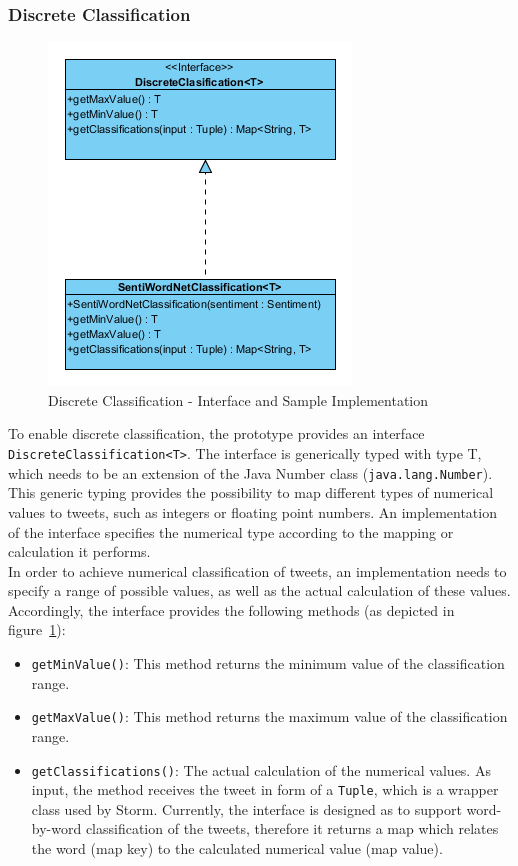 \documentclass[a4paper]{article}
\begin{document}
\subsubsection{Discrete Classification}\label{section_discrete}
\begin{figure}[h!]
	\centering
	\includegraphics[scale=2.5]{images/uml_discrete.png}
	\caption{Discrete Classification - Interface and Sample Implementation}
	\label{uml_discrete}
\end{figure}
To enable discrete classification, the prototype provides an interface \texttt{DiscreteClassification<T>}. The interface is generically typed with type T, which needs to be an extension of the Java Number class (\texttt{java.lang.Number}). This generic typing provides the possibility to map different types of numerical values to tweets, such as integers or floating point numbers. An implementation of the interface specifies the numerical type according to the mapping or calculation it performs.\\
In order to achieve numerical classification of tweets, an implementation needs to specify a range of possible values, as well as the actual calculation of these values. Accordingly, the interface provides the following methods (as depicted in figure~\ref{uml_discrete}):
\begin{itemize}
\item \texttt{getMinValue()}: This method returns the minimum value of the classification range.
\item \texttt{getMaxValue()}: This method returns the maximum value of the classification range.
\item \texttt{getClassifications()}: The actual calculation of the numerical values. As input, the method receives the tweet in form of a \texttt{Tuple}, which is a wrapper class used by Storm. Currently, the interface is designed as to support word-by-word classification of the tweets, therefore it returns a map which relates the word (map key) to the calculated numerical value (map value).
\end{itemize}
\end{document}
